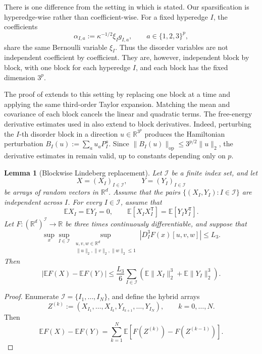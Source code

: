 \documentclass[12pt]{article}
\newtheorem{lemma}[theorem]{Lemma}
\newcommand{\E}{\mathbb{E}}
\newcommand{\R}{\mathbb{R}}
\begin{document}
\begin{appendix}
There is one difference from the setting in which
\cite[Theorem~6]{anschuetz2025bounds} is stated. Our sparsification is
hyperedge-wise rather than coefficient-wise. For a fixed hyperedge \(I\), the
coefficients
\[
    \alpha_{I,a}
    :=
    \kappa^{-1/2}\xi_I g_{I,a},
    \qquad
    a\in\{1,2,3\}^p,
\]
share the same Bernoulli variable \(\xi_I\). Thus the disorder variables are
not independent coefficient by coefficient. They are, however, independent
block by block, with one block for each hyperedge \(I\), and each block has
the fixed dimension \(3^p\).

The proof of \cite[Theorem~6]{anschuetz2025bounds} extends to this setting by
replacing one block at a time and applying the same third-order Taylor
expansion. Matching the mean and covariance of each block cancels the linear
and quadratic terms. The free-energy derivative estimates used in
\cite[Theorem~6]{anschuetz2025bounds} also extend to block derivatives.
Indeed, perturbing the \(I\)-th disorder block in a direction
\(u\in\R^{3^p}\) produces the Hamiltonian perturbation
\(B_I(u):=\sum_a u_aP_I^a\). Since
\(\|B_I(u)\|_{\mathrm{op}}\le 3^{p/2}\|u\|_2\), the derivative estimates
in \cite[Lemma~26]{anschuetz2025bounds} remain valid, up to constants
depending only on \(p\).

\begin{lemma}[Blockwise Lindeberg replacement]
\label{lem:blockwise-lindeberg}
Let \(\mathcal I\) be a finite index set, and let
\[
    X=(X_I)_{I\in\mathcal I},
    \qquad
    Y=(Y_I)_{I\in\mathcal I}
\]
be arrays of random vectors in \(\R^d\). Assume that the pairs $\{(X_I,Y_I):I\in\mathcal I\}$ are independent across \(I\). For every \(I\in\mathcal I\), assume that
\[
    \E X_I=\E Y_I=0,
    \qquad
    \E[X_IX_I^\mathsf T]
    =
    \E[Y_IY_I^\mathsf T].
\]
Let \(F:(\R^d)^{\mathcal I}\to\R\) be three times continuously
differentiable, and suppose that
\[
    \sup_{x}
    \sup_{I\in\mathcal I}
    \sup_{\substack{u,v,w\in\R^d\\
                    \|u\|_2,\|v\|_2,\|w\|_2\le1}}
    \left|
        D_I^3F(x)[u,v,w]
    \right|
    \le L_3.
\]
Then
\[
    \left|
        \E F(X)-\E F(Y)
    \right|
    \le
    \frac{L_3}{6}
    \sum_{I\in\mathcal I}
    \left(
        \E\|X_I\|_2^3
        +
        \E\|Y_I\|_2^3
    \right).
\]
\end{lemma}

\begin{proof}
Enumerate
\(\mathcal I=\{I_1,\ldots,I_N\}\), and define the hybrid arrays
\[
    Z^{(k)}
    :=
    (X_{I_1},\ldots,X_{I_k},
      Y_{I_{k+1}},\ldots,Y_{I_N}),
    \qquad
    k=0,\ldots,N.
\]
Then
\[
    \E F(X)-\E F(Y)
    =
    \sum_{k=1}^N
    \E\left[
        F(Z^{(k)})-F(Z^{(k-1)})
    \right].
\]


\end{proof}
\end{appendix}
\end{document}
